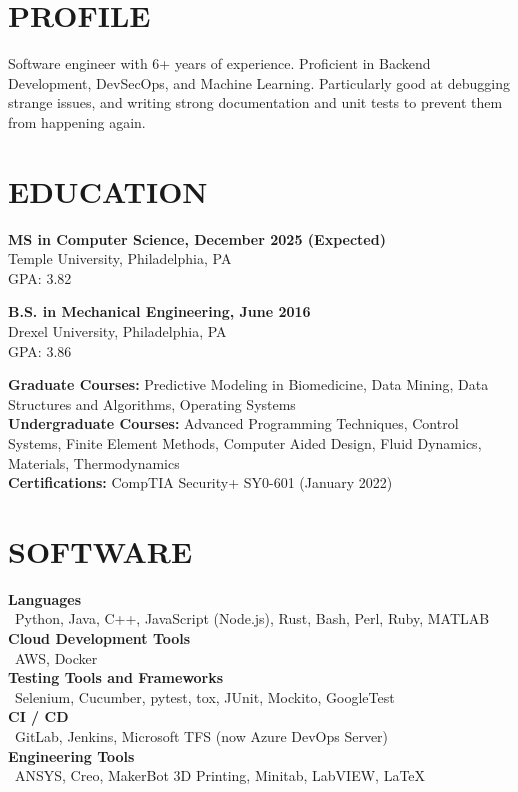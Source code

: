 \documentclass[line,resmargin]{res}
\begin{document}
\address{ https://www.andygnias.com/ }
\begin{resume}

\section{PROFILE}
Software engineer with 6+ years of experience. Proficient in Backend Development, DevSecOps, and Machine Learning. Particularly good at debugging 
strange issues, and writing strong documentation and unit tests to prevent them from happening again.
 
\section{EDUCATION}
\textbf{MS in Computer Science, December 2025 (Expected)} \\
Temple University, Philadelphia, PA \\
GPA: 3.82

\textbf{B.S. in Mechanical Engineering, June 2016} \\
Drexel University, Philadelphia, PA \\
GPA: 3.86

\textbf{Graduate Courses:} Predictive Modeling in Biomedicine, Data Mining, Data Structures and Algorithms, Operating Systems \\
\textbf{Undergraduate Courses:} Advanced Programming Techniques, Control Systems, Finite Element Methods, Computer Aided Design, Fluid Dynamics, Materials, Thermodynamics \\
\textbf{Certifications:}  CompTIA Security+ SY0-601 (January 2022) \\
	
\section{SOFTWARE}
\textbf{Languages} \\
\textbullet\ Python, Java, C++, JavaScript (Node.js), Rust, Bash, Perl, Ruby, MATLAB  \\
\textbf{Cloud Development Tools} \\
\textbullet\ AWS, Docker \\
\textbf{Testing Tools and Frameworks} \\
\textbullet\ Selenium, Cucumber, pytest, tox, JUnit, Mockito, GoogleTest \\
\textbf{CI / CD} \\
\textbullet\ GitLab, Jenkins, Microsoft TFS (now Azure DevOps Server) \\
\textbf{Engineering Tools} \\
\textbullet\ ANSYS, Creo, MakerBot 3D Printing, Minitab, LabVIEW, \LaTeX        
 

\end{resume}
\end{document}
